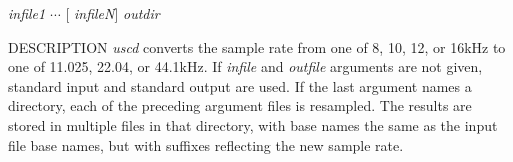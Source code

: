 % 
% 
% 
% 
%                                                                        
%

\begin{synopsis}
\item [uscd] [ --s $S$ $S$] [ +{\em type} ] [ {\em infile} ] [ {\em outfile} ]
\item [uscd] [ --s $S$ $S$] [ +{\em type} ] {\em infile1} $\cdots$ [ {\em infileN}] {\em outdir} 
\end{synopsis}

\begin{qsection}{DESCRIPTION}
{\em uscd} converts the sample rate from one of 8, 10, 12, or 16kHz 
to one of 11.025, 22.04, or 44.1kHz.
If {\em infile} and {\em outfile} arguments are not given, 
standard input and standard output are used.
If the last argument names a directory, 
each of the preceding argument files is resampled. 
The results are stored in multiple files in that directory, 
with base names the same as the input file base names, 
but with suffixes reflecting the new sample rate.
\end{qsection}

